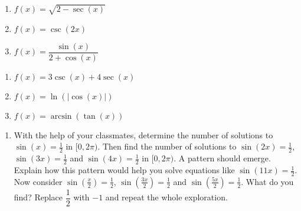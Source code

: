 \begin{multicols}{3}

\begin{enumerate}

\setcounter{enumi}{\value{HW}}

\item $f(x) = \sqrt{2 - \sec(x)}$ 
\item $f(x) = \csc(2x)$ 
\item $f(x) = \dfrac{\sin(x)}{2 + \cos(x)}$

\setcounter{HW}{\value{enumi}}

\end{enumerate}

\end{multicols}

\begin{multicols}{3}

\begin{enumerate}

\setcounter{enumi}{\value{HW}}

\item $f(x) = 3\csc(x) + 4\sec(x)$ 
\item $f(x) = \ln\left( |\cos(x)| \right)$
\item $f(x) = \arcsin(\tan(x))$ \label{domainlast}

\setcounter{HW}{\value{enumi}}

\end{enumerate}

\end{multicols}

\begin{enumerate}

\setcounter{enumi}{\value{HW}}

\item With the help of your classmates, determine the number of solutions to $\sin(x) = \frac{1}{2}$ in $[0,2\pi)$.  Then find the number of solutions to $\sin(2x) = \frac{1}{2}$,  $\sin(3x) = \frac{1}{2}$ and $\sin(4x) = \frac{1}{2}$ in $[0,2\pi)$.  A pattern should emerge.  Explain how this pattern would help you solve equations like $\sin(11x) = \frac{1}{2}$.  Now consider $\sin\left(\frac{x}{2}\right)  = \frac{1}{2}$,  $\sin\left(\frac{3x}{2}\right)  = \frac{1}{2}$ and $\sin\left(\frac{5x}{2}\right)  = \frac{1}{2}$.  What do you find?  Replace $\dfrac{1}{2}$ with $-1$ and repeat the whole exploration.

\end{enumerate}

